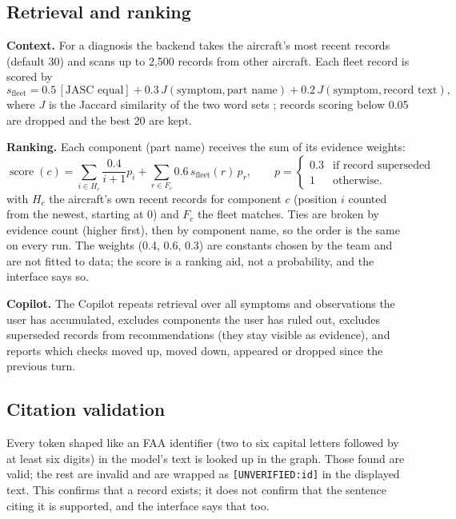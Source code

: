 \subsection{Retrieval and ranking}

\textbf{Context.} For a diagnosis the backend takes the aircraft's most recent records (default 30) and scans up to 2{,}500 records from other aircraft. Each fleet record is scored by
\[
s_{\mathrm{fleet}} = 0.5\,[\text{JASC equal}] + 0.3\,J(\text{symptom},\text{part name}) + 0.2\,J(\text{symptom},\text{record text}),
\]
where $J$ is the Jaccard similarity of the two word sets \citep{jaccard1912}; records scoring below 0.05 are dropped and the best 20 are kept.

\textbf{Ranking.} Each component (part name) receives the sum of its evidence weights:
\[
\operatorname{score}(c)=\sum_{i\in H_c}\frac{0.4}{i+1}p_i
+\sum_{r\in F_c}0.6\,s_{\mathrm{fleet}}(r)\,p_r,
\qquad
p=\begin{cases}0.3&\text{if record superseded}\\1&\text{otherwise.}\end{cases}
\]
with $H_c$ the aircraft's own recent records for component $c$ (position $i$ counted from the newest, starting at 0) and $F_c$ the fleet matches. Ties are broken by evidence count (higher first), then by component name, so the order is the same on every run. The weights (0.4, 0.6, 0.3) are constants chosen by the team and are not fitted to data; the score is a ranking aid, not a probability, and the interface says so.

\textbf{Copilot.} The Copilot repeats retrieval over all symptoms and observations the user has accumulated, excludes components the user has ruled out, excludes superseded records from recommendations (they stay visible as evidence), and reports which checks moved up, moved down, appeared or dropped since the previous turn.

\subsection{Citation validation}

Every token shaped like an FAA identifier (two to six capital letters followed by at least six digits) in the model's text is looked up in the graph. Those found are valid; the rest are invalid and are wrapped as \texttt{[UNVERIFIED:id]} in the displayed text. This confirms that a record exists; it does not confirm that the sentence citing it is supported, and the interface says that too.

